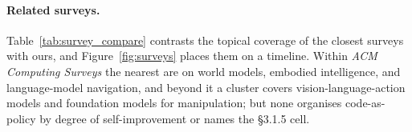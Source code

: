 \paragraph{Related surveys.}
Table~\ref{tab:survey_compare} contrasts the topical coverage of the closest surveys with
ours, and Figure~\ref{fig:surveys} places them on a timeline. Within \emph{ACM Computing
Surveys} the nearest are on world models, embodied intelligence, and language-model
navigation, and beyond it a cluster covers vision-language-action models and foundation models
for manipulation; but none organises code-as-policy by degree of self-improvement or names
the \S3.1.5 cell.



\FloatBarrier
